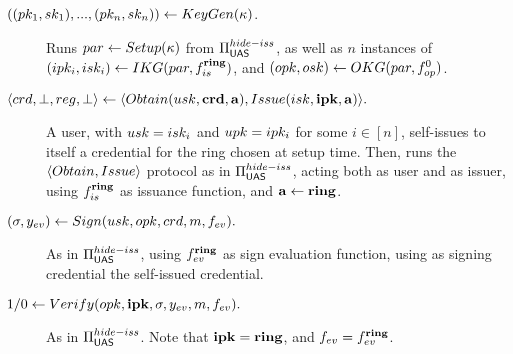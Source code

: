 

\begin{description}
\item[$((pk_1,sk_1),...,(pk_n,sk_n)) \gets KeyGen(\kappa)$.] Runs
  $par \gets Setup(\kappa)$ from $\Pi_{\mathsf{UAS}}^{hide-iss}$, as well as $n$
  instances of $(ipk_i,isk_i) \gets IKG(par,f_{is}^{\mathbf{ring}})$, and
  $(opk,osk) \gets OKG(par,f_{op}^0)$.
\item[$\langle crd,\bot,reg,\bot \rangle \gets
  \langle Obtain(usk,\mathbf{crd},\mathbf{a}),Issue(isk,\mathbf{ipk},\mathbf{a})\rangle.$]
  A user, with $usk=isk_i$ and $upk=ipk_i$ for some $i \in [n]$, self-issues
  to itself a credential for the ring \sring chosen at setup time. Then, runs
  the $\langle Obtain,Issue \rangle$ protocol as in $\Pi_{\mathsf{UAS}}^{hide-iss}$,
  acting both as user and as issuer, using $f_{is}^{\mathbf{ring}}$ as issuance
  function, and $\mathbf{a} \gets \mathbf{ring}$.
\item[$(\sigma,y_{ev}) \gets Sign(usk,opk,crd,m,f_{ev}).$] As in
  $\Pi_{\mathsf{UAS}}^{hide-iss}$, using $f_{ev}^{\mathbf{ring}}$ as sign evaluation function,
  using as signing credential the self-issued credential.
\item[$1/0 \gets Verify(opk,\mathbf{ipk},\sigma,y_{ev},m,f_{ev}).$] As in
  $\Pi_{\mathsf{UAS}}^{hide-iss}$. Note that $\mathbf{ipk}=\mathbf{ring}$, and $f_{ev}=f_{ev}^{\mathbf{ring}}$.
\end{description}

